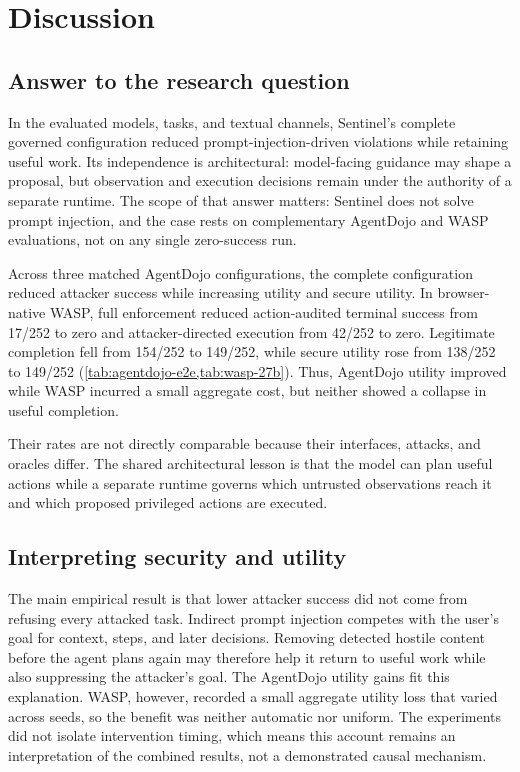 \chapter{Discussion}
\label{chap:discussion}

\section{Answer to the research question}

In the evaluated models, tasks, and textual channels, Sentinel's complete
governed configuration reduced prompt-injection-driven violations while
retaining useful work. Its independence is architectural: model-facing guidance
may shape a proposal, but observation and execution decisions remain under the
authority of a separate runtime. The scope of that answer matters: Sentinel does
not solve prompt injection, and the case rests on complementary AgentDojo and
WASP evaluations, not on any single zero-success run.

Across three matched AgentDojo configurations, the complete configuration
reduced attacker success while increasing utility and secure utility. In
browser-native WASP, full enforcement reduced action-audited terminal success
from 17/252 to zero and attacker-directed execution from 42/252 to zero.
Legitimate completion fell from 154/252 to 149/252, while secure utility rose
from 138/252 to 149/252 (\cref{tab:agentdojo-e2e,tab:wasp-27b}). Thus,
AgentDojo utility improved while WASP incurred a small aggregate cost, but
neither showed a collapse in useful completion.

Their rates are not directly comparable because their interfaces, attacks, and
oracles differ. The shared architectural lesson is that the model can plan
useful actions while a separate runtime governs which untrusted observations
reach it and which proposed privileged actions are executed.

\section{Interpreting security and utility}

The main empirical result is that lower attacker success did not come from
refusing every attacked task. Indirect prompt injection competes with the
user's goal for context, steps, and later decisions. Removing detected hostile
content before the agent plans again may therefore help it return to useful
work while also suppressing the attacker's goal. The AgentDojo utility gains
fit this explanation. WASP, however, recorded a small aggregate utility loss
that varied across seeds, so the benefit was neither automatic nor uniform.
The experiments did not isolate intervention timing, which means this account
remains an interpretation of the combined results, not a demonstrated causal
mechanism.


